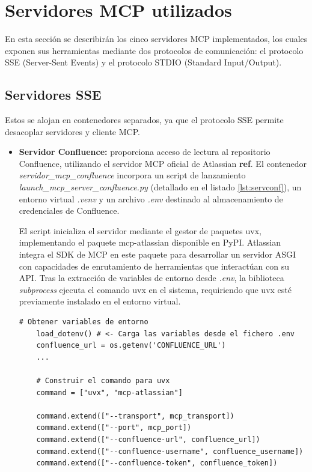 \section{Servidores MCP utilizados}
En esta sección se describirán los cinco servidores MCP implementados, los cuales exponen sus herramientas mediante dos protocolos de comunicación: el protocolo SSE (Server-Sent Events) y el protocolo STDIO (Standard Input/Output).

\subsection{Servidores SSE}
Estos se alojan en contenedores separados, ya que el protocolo SSE permite desacoplar servidores y cliente MCP.

\begin{itemize}
\item \textbf{Servidor Confluence:} proporciona acceso de lectura al repositorio Confluence, utilizando el servidor MCP oficial de Atlassian \textbf{ref}. El contenedor \textit{servidor\_mcp\_confluence} incorpora un script de lanzamiento \textit{launch\_mcp\_server\_confluence.py} (detallado en el listado \ref{lst:servconf}), un entorno virtual \textit{.venv} y un archivo \textit{.env} destinado al almacenamiento de credenciales de Confluence.

El script inicializa el servidor mediante el gestor de paquetes uvx, implementando el paquete mcp-atlassian disponible en PyPI. Atlassian integra el SDK de MCP en este paquete para desarrollar un servidor ASGI con capacidades de enrutamiento de herramientas que interactúan con su API. Tras la extracción de variables de entorno desde \textit{.env}, la biblioteca \textit{subprocess} ejecuta el comando uvx en el sistema, requiriendo que uvx esté previamente instalado en el entorno virtual.
\begin{lstlisting}[caption={\textit{launch\_mcp\_server\_confluence.py}: ejecución de lanzamiento del servidor MCP Confluence},label={lst:servconf}]
    # Obtener variables de entorno
    load_dotenv() # <- Carga las variables desde el fichero .env
    confluence_url = os.getenv('CONFLUENCE_URL')
    ...

    # Construir el comando para uvx
    command = ["uvx", "mcp-atlassian"]
    
    command.extend(["--transport", mcp_transport])
    command.extend(["--port", mcp_port]) 
    command.extend(["--confluence-url", confluence_url])
    command.extend(["--confluence-username", confluence_username])
    command.extend(["--confluence-token", confluence_token])


\end{lstlisting}
\end{itemize}
